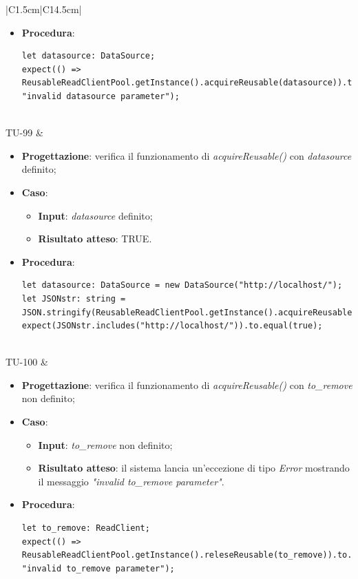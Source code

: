 \begin{longtable}{|C{1.5cm}|C{14.5cm}|}
\begin{itemize}
\begin{itemize}
	\end{itemize}
	\item \textbf{Procedura}:
	\begin{lstlisting}
let datasource: DataSource;
expect(() => ReusableReadClientPool.getInstance().acquireReusable(datasource)).to.throw(Error, "invalid datasource parameter");
	\end{lstlisting}
\end{itemize}\\
\hline
{TU-99} &
\begin{itemize}
	\item \textbf{Progettazione}: verifica il funzionamento di \emph{acquireReusable()} con \emph{datasource} definito;
	\item \textbf{Caso}: 
	\begin{itemize}
		\item \textbf{Input}: \emph{datasource} definito;
		\item \textbf{Risultato atteso}: TRUE.
	\end{itemize}
	\item \textbf{Procedura}:
	\begin{lstlisting}
let datasource: DataSource = new DataSource("http://localhost/");
let JSONstr: string = JSON.stringify(ReusableReadClientPool.getInstance().acquireReusable(datasource));
expect(JSONstr.includes("http://localhost/")).to.equal(true);
	\end{lstlisting}
\end{itemize}\\
\hline
{TU-100} &
\begin{itemize}
	\item \textbf{Progettazione}: verifica il funzionamento di \emph{acquireReusable()} con \emph{to\_remove} non definito;
	\item \textbf{Caso}: 
	\begin{itemize}
		\item \textbf{Input}: \emph{to\_remove} non definito;
		\item \textbf{Risultato atteso}: il sistema lancia un'eccezione di tipo \emph{Error} mostrando il messaggio \emph{"invalid to\_remove parameter"}.
	\end{itemize}
	\item \textbf{Procedura}:
	\begin{lstlisting}
let to_remove: ReadClient;
expect(() => ReusableReadClientPool.getInstance().releseReusable(to_remove)).to.throw(Error, "invalid to_remove parameter");
	\end{lstlisting}

\end{itemize}
\end{longtable}
